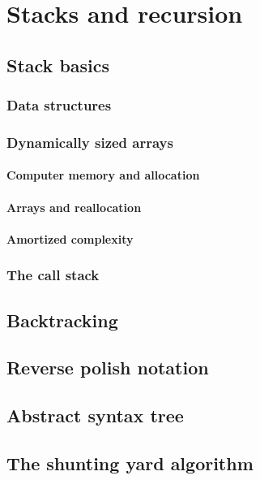 \documentclass{report}
\begin{document}
	
	\chapter{Stacks and recursion}
	
	\section{Stack basics}
	\subsection{Data structures}
	\subsection{Dynamically sized arrays}
	\subsubsection{Computer memory and allocation}
	\subsubsection{Arrays and reallocation}
	\subsubsection{Amortized complexity}
	
	
	
	
	
	\subsection{The call stack}
	
	\section{Backtracking}
	\section{Reverse polish notation}
	\section{Abstract syntax tree}
	\section{The shunting yard algorithm}
\end{document}
